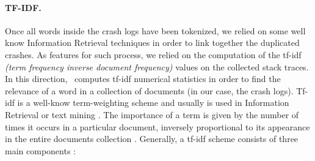 \paragraph{TF-IDF.} 
Once all words inside the crash logs have been tokenized, we relied on some well know Information Retrieval techniques in order to link together the duplicated crashes.
As features for such process, we relied on the computation of the tf-idf \textit{(term frequency inverse document frequency)} values on the collected stack traces. 
In this direction, \toolname\ computes tf-idf numerical statistics in order to find the relevance of a word in a collection of documents (in our case, the crash logs). 
Tf-idf is a well-know term-weighting scheme and usually is used in Information Retrieval or text mining \cite{tfidf}. %
The importance of a term is given by the number of times it occurs in a particular document, inversely proportional to its appearance in the entire documents collection \cite{campbell}. 
Generally, a tf-idf scheme consists of three main components \cite{tfidfsimilarity}: 
